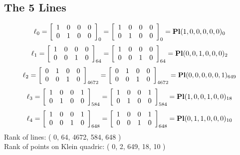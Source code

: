 \documentclass{article}
\begin{document}
{\subsection*{The 5 Lines}
$$
\ell_{0} = 
\left[
\begin{array}{*{4}{r}}
1 & 0 & 0 & 0\\
0 & 1 & 0 & 0\\
\end{array}
\right]
_{0}
=
\left[
\begin{array}{*{4}c}
1  & 0  & 0  & 0\\
0  & 1  & 0  & 0\\
\end{array}
\right]_{0}
={\rm\bf Pl}(1,0,0,0,0,0 )_{0}$$
$$
\ell_{1} = 
\left[
\begin{array}{*{4}{r}}
1 & 0 & 0 & 0\\
0 & 0 & 1 & 0\\
\end{array}
\right]
_{64}
=
\left[
\begin{array}{*{4}c}
1  & 0  & 0  & 0\\
0  & 0  & 1  & 0\\
\end{array}
\right]_{64}
={\rm\bf Pl}(0,0,1,0,0,0 )_{2}$$
$$
\ell_{2} = 
\left[
\begin{array}{*{4}{r}}
0 & 1 & 0 & 0\\
0 & 0 & 1 & 0\\
\end{array}
\right]
_{4672}
=
\left[
\begin{array}{*{4}c}
0  & 1  & 0  & 0\\
0  & 0  & 1  & 0\\
\end{array}
\right]_{4672}
={\rm\bf Pl}(0,0,0,0,0,1 )_{649}$$
$$
\ell_{3} = 
\left[
\begin{array}{*{4}{r}}
1 & 0 & 0 & 1\\
0 & 1 & 0 & 0\\
\end{array}
\right]
_{584}
=
\left[
\begin{array}{*{4}c}
1  & 0  & 0  & 1\\
0  & 1  & 0  & 0\\
\end{array}
\right]_{584}
={\rm\bf Pl}(1,0,0,1,0,0 )_{18}$$
$$
\ell_{4} = 
\left[
\begin{array}{*{4}{r}}
1 & 0 & 0 & 1\\
0 & 0 & 1 & 0\\
\end{array}
\right]
_{648}
=
\left[
\begin{array}{*{4}c}
1  & 0  & 0  & 1\\
0  & 0  & 1  & 0\\
\end{array}
\right]_{648}
={\rm\bf Pl}(0,1,1,0,0,0 )_{10}$$
Rank of lines: ( 0, 64, 4672, 584, 648 )\\
Rank of points on Klein quadric: ( 0, 2, 649, 18, 10 )\\
}
\end{document}
